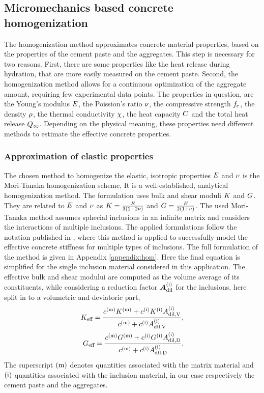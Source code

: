 \subsection{Micromechanics based concrete homogenization}
The homogenization method approximates concrete material properties, based on the properties of the cement paste and the aggregates.
This step is necessary for two reasons.
First, there are some properties like the heat release during hydration, that are more easily measured on the cement paste.
Second, the homogenization method allows for a continuous optimization of the aggregate amount, requiring few experimental data points.
The properties in question, are the Young's modulus $E$, the Poission's ratio $\nu$, the compressive strength $f_{\text{c}}$, the density $\rho$, the thermal conductivity $\chi$, the heat capacity $C$ and the total heat release $Q_{\infty}$.
Depending on the physical meaning, these properties need different methods to estimate the effective concrete properties.
\subsubsection{Approximation of elastic properties}
The chosen method to homogenize the elastic, isotropic properties $E$ and $\nu$ is the Mori-Tanaka homogenization scheme, \cite{mor_1973_asi}
It is a well-established, analytical homogenization method.
The formulation uses bulk and shear moduli $K$ and $G$.
They are related to $E$ and $\nu$ as $K = \frac{E}{3(1-2\nu)}$ and $G = \frac{E}{2(1+\nu)}$.
The used Mori-Tanaka method assumes sphecial inclusions in an infinite matrix and considers the interactions of multiple inclusions.
The applied formulations follow the notation published in 
\cite{nee_2012_ammf}, where this method is applied to successfully model the effective concrete stiffness for multiple types of inclusions.
The full formulation of the method is given in Appendix \ref{appendix:hom}.
Here the final equation is simplified for the single inclusion material considered in this application.
The effective bulk and shear modului are computed as the volume average of its constituents,  
while considering a reduction factor $\boldsymbol{A}_{\text{dil}}^{(\text{i})}$ for the inclusions, here split in to a volumetric and deviatoric part,
\begin{align}
K_{\text{eff}} = \dfrac{c^{(\text{m})}K^{(\text{m})} + c^{(\text{i})} K^{(\text{i})} A^{(\text{i})}_{\text{dil,V}}}{c^{(\text{m})} +  c^{(\text{i})} A^{(\text{i})}_{\text{dil,V}}}, \\
G_{\text{eff}} = \dfrac{c^{(\text{m})}G^{(\text{m})} +  c^{(\text{i})} G^{(\text{i})} A^{(\text{i})}_{\text{dil,D}}}{c^{(\text{m})} +  c^{(\text{i})} A^{(\text{i})}_{\text{dil,D}}}.
\end{align}
The superscript $(\text{m})$ denotes quantities associated with the matrix material and   $(\text{i})$ quantities associated with the inclusion material, in our case respectively the cement paste and the aggregates.

